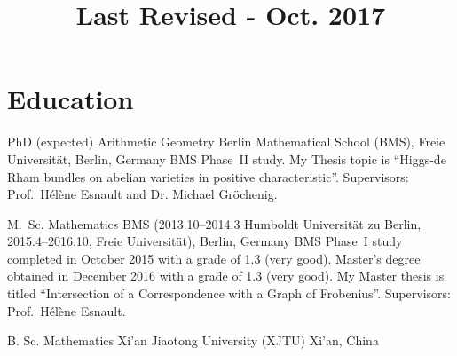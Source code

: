 \documentclass[11pt,a4paper,roman]{moderncv}
\title{\normalsize Last Revised - Oct. 2017}
\begin{document}
\maketitle





\section{Education}
%
{PhD (expected)}%
{Arithmetic Geometry}%
{Berlin Mathematical School (BMS), Freie Universität, Berlin, Germany}%
{}%
{
    BMS Phase~II study. My Thesis topic is
    ``Higgs-de Rham bundles on abelian varieties in positive characteristic''.
    Supervisors: Prof.\ Hélène Esnault and Dr. Michael Gröchenig.
}

{M.\ Sc.}%
{Mathematics}%
{%
    BMS (2013.10--2014.3 Humboldt Universität zu Berlin,
    2015.4--2016.10, Freie Universität), Berlin, Germany}%
{}%
{%
    BMS Phase~I study completed in October 2015 with a grade of 1.3 (very good).
    Master's degree obtained in December 2016 with a grade of 1.3 (very good).
    My Master thesis is titled
    ``Intersection of a Correspondence with a Graph of Frobenius''.
    Supervisors: Prof.\ Hélène Esnault.
}

%
{B. Sc.}%
{Mathematics}%
{Xi'an Jiaotong University (XJTU)}%
{Xi'an, China}{}%
\end{document}
